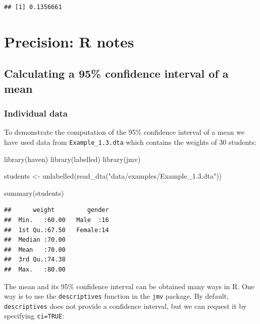 \documentclass[
]{memoir}
\newenvironment{Shaded}{\begin{snugshade}}{\end{snugshade}}
\newcommand{\FunctionTok}[1]{\textcolor[rgb]{0.00,0.00,0.00}{#1}}
\newcommand{\NormalTok}[1]{#1}
\newcommand{\OtherTok}[1]{\textcolor[rgb]{0.56,0.35,0.01}{#1}}
\newcommand{\StringTok}[1]{\textcolor[rgb]{0.31,0.60,0.02}{#1}}
\begin{document}
\begin{verbatim}
## [1] 0.1356661
\end{verbatim}

\hypertarget{precision-r-notes}{%
\chapter{Precision: R notes}\label{precision-r-notes}}

\hypertarget{calculating-a-95-confidence-interval-of-a-mean}{%
\section{Calculating a 95\% confidence interval of a mean}\label{calculating-a-95-confidence-interval-of-a-mean}}

\hypertarget{individual-data}{%
\subsection{Individual data}\label{individual-data}}

To demonstrate the computation of the 95\% confidence interval of a mean we have used data from \texttt{Example\_1.3.dta} which contains the weights of 30 students:

\begin{Shaded}
\begin{Highlighting}[]
\FunctionTok{library}\NormalTok{(haven)}
\FunctionTok{library}\NormalTok{(labelled)}
\FunctionTok{library}\NormalTok{(jmv)}

\NormalTok{students }\OtherTok{\textless{}{-}} \FunctionTok{unlabelled}\NormalTok{(}\FunctionTok{read\_dta}\NormalTok{(}\StringTok{"data/examples/Example\_1.3.dta"}\NormalTok{))}

\FunctionTok{summary}\NormalTok{(students)}
\end{Highlighting}
\end{Shaded}

\begin{verbatim}
##      weight         gender  
##  Min.   :60.00   Male  :16  
##  1st Qu.:67.50   Female:14  
##  Median :70.00              
##  Mean   :70.00              
##  3rd Qu.:74.38              
##  Max.   :80.00
\end{verbatim}

The mean and its 95\% confidence interval can be obtained many ways in R. One way is to use the \texttt{descriptives} function in the \texttt{jmv} package. By default, \texttt{descriptives} does not provide a confidence interval, but we can request it by specifying \texttt{ci=TRUE}:
\end{document}

